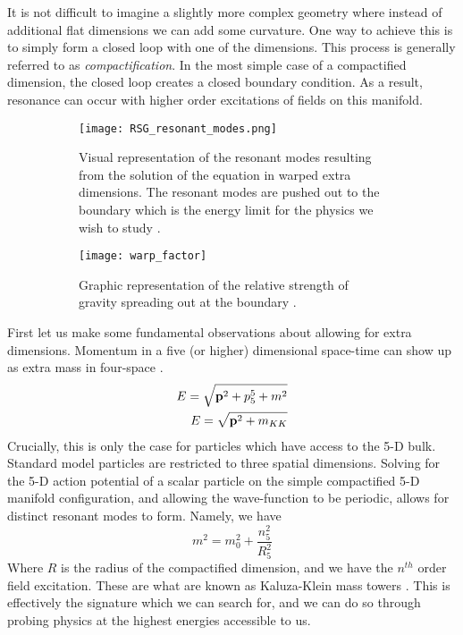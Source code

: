 \documentclass[12pt]{article}
\begin{document}
It is not difficult to imagine a slightly more complex geometry where instead of
additional flat dimensions we can add some curvature. One way to achieve this is
to simply form a closed loop with one of the dimensions. This process is
generally referred to as \textit{compactification}. In the most simple case of a
compactified dimension, the closed loop creates a closed boundary condition. As
a result, resonance can occur with higher order excitations of fields on this
manifold. 

\begin{figure}[t]
    \centering
    \begin{subfigure}[t]{.48\textwidth}
        \centering
        \texttt{[image: RSG\_resonant\_modes.png]}
        \caption{Visual representation of the resonant modes resulting from the
        solution of the equation in warped extra dimensions. The resonant modes
        are pushed out to the boundary which is the energy limit for the physics we
        wish to study \cite{bsm}.}
        \label{subfig:RSG_resonant_modes}
    \end{subfigure}
    \hfill
    \begin{subfigure}[t]{.48\textwidth}
        \centering
        \texttt{[image: warp\_factor]}
        \caption{Graphic representation of the relative strength of gravity
        spreading out at the boundary \cite{bsm}.}
        \label{subfig:warp_factor}
    \end{subfigure}
\caption{}
\label{fig:theoretical_motivation_figure}
\end{figure}

First let us make some fundamental observations about allowing for extra
dimensions. Momentum in a five (or higher) dimensional space-time can show up as
extra mass in four-space \cite{KALUZA_2018, bsm}. 
\begin{align}
    E = \sqrt{\vb{p}^2 + p_5^5 + m^2} \\
    E = \sqrt{\vb{p}^2 + m_{KK}}
\end{align}
Crucially, this is only the case for particles which have access to the 5-D
bulk. Standard model particles are restricted to three spatial dimensions.
Solving for the 5-D action potential of a scalar particle on the simple
compactified 5-D manifold configuration, and allowing the wave-function to be
periodic, allows for distinct resonant modes to form. Namely, we have
\begin{equation}
    m^2 = m_0^2 + \frac{n_5^2}{R_5^2}
\end{equation}
Where $R$ is the radius of the compactified dimension, and we have the $n^{th}$
order field excitation. These are what are known as Kaluza-Klein mass towers
\cite{KALUZA_2018, bsm}. This is effectively the signature which we can search
for, and we can do so through probing physics at the highest energies accessible
to us.
\end{document}
